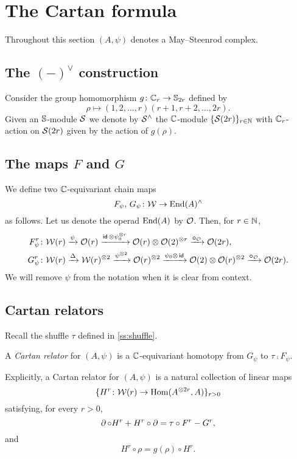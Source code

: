
\section{The Cartan formula}\label{s:cartan}

Throughout this section $(A,\psi)$ denotes a May--Steenrod complex.

\subsection{The $(-)^\vee$ construction}

Consider the group homomorphism $g \colon \mathbb{C}_r \to \mathbb{S}_{2r}$ defined by
\[
\rho \mapsto (1,2,\dots,r)(r+1,r+2,\dots,2r).
\]
Given an $\mathbb{S}$-module $\mathcal{S}$ we denote by $\mathcal{S}^\wedge$ the $\mathbb{C}$-module $\{\mathcal{S}(2r)\}_{r\in\mathbb{N}}$ with $\mathbb{C}_r$-action on $\mathcal{S}(2r)$ given by the action of $g(\rho)$.

\subsection{The maps $F$ and $G$}

We define two $\mathbb{C}$-equivariant chain maps
\[
F_\psi,\, G_\psi \colon \mathcal{W} \to \mathrm{End}(A)^\wedge
\]
as follows.
Let us denote the operad $\mathrm{End}(A)$ by $\mathcal{O}$.
Then, for $r \in \mathbb{N}$,
\begin{align*}
	F_\psi^r \colon& \mathcal{W}(r) \xrightarrow{\psi} \mathcal{O}(r) \xrightarrow{\mathsf{id}\, \otimes \psi_0^{\otimes r}}
	\mathcal{O}(r) \otimes \mathcal{O}(2)^{\otimes r} \xrightarrow{\bm{\circ}_{\mathcal{O}}}
	\mathcal{O}(2r), \\
	G_\psi^r \colon& \mathcal{W}(r) \xrightarrow{\Delta}
	\mathcal{W}(r)^{\otimes 2} \xrightarrow{\psi^{\otimes 2}}
	\mathcal{O}(r)^{\otimes 2} \xrightarrow{\psi_0 \otimes\, \mathsf{id}}
	\mathcal{O}(2) \otimes \mathcal{O}(r)^{\otimes 2} \xrightarrow{\bm{\circ}_{\mathcal{O}}}
	\mathcal{O}(2r).
\end{align*}
We will remove $\psi$ from the notation when it is clear from context.

\subsection{Cartan relators}\label{ss:cartan_relators}

Recall the shuffle $\tau$ defined in \cref{ss:shuffle}.

\begin{definition}
	A \textit{Cartan relator} for $(A,\psi)$ is a $\mathbb{C}$-equivariant homotopy from $G_\psi$ to $\tau \comp F_\psi$.
\end{definition}

Explicitly, a Cartan relator for $(A,\psi)$ is a natural collection of linear maps
\[
\{H^r \colon \mathcal{W}(r) \to \mathrm{Hom}(A^{\otimes 2r}, A)\}_{r>0}
\]
satisfying, for every $r > 0$,
\[
\operatorname{\partial} \circ H^r + H^r \mathbin{\circ} \operatorname{\partial} = \tau \mathbin{\circ} F^r - G^r,
\]
and
\[
H^r \circ \rho = g(\rho) \circ H^r.
\]

